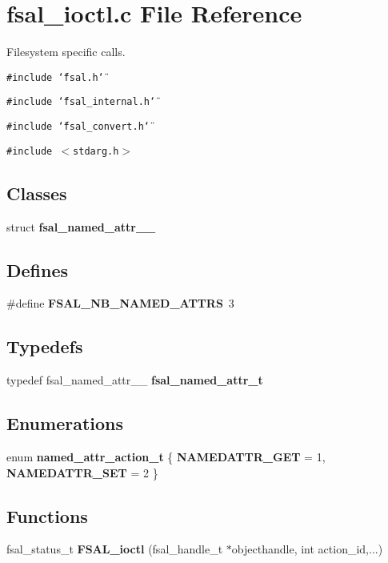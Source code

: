 \section{fsal\_\-ioctl.c File Reference}
\label{fsal__ioctl_8c}
Filesystem specific calls. 

{\tt \#include \char`\"{}fsal.h\char`\"{}}\par
{\tt \#include \char`\"{}fsal\_\-internal.h\char`\"{}}\par
{\tt \#include \char`\"{}fsal\_\-convert.h\char`\"{}}\par
{\tt \#include $<$stdarg.h$>$}\par
\subsection*{Classes}
\begin{CompactItemize}
\item 
struct {\bf fsal\_\-named\_\-attr\_\-\_\-}
\end{CompactItemize}
\subsection*{Defines}
\begin{CompactItemize}
\item 
\#define {\bf FSAL\_\-NB\_\-NAMED\_\-ATTRS}\ 3\label{fsal__ioctl_8c_a0}

\end{CompactItemize}
\subsection*{Typedefs}
\begin{CompactItemize}
\item 
typedef fsal\_\-named\_\-attr\_\-\_\- {\bf fsal\_\-named\_\-attr\_\-t}\label{fsal__ioctl_8c_a1}

\end{CompactItemize}
\subsection*{Enumerations}
\begin{CompactItemize}
\item 
enum {\bf named\_\-attr\_\-action\_\-t} \{ {\bf NAMEDATTR\_\-GET} =  1, 
{\bf NAMEDATTR\_\-SET} =  2
 \}
\end{CompactItemize}
\subsection*{Functions}
\begin{CompactItemize}
\item 
fsal\_\-status\_\-t {\bf FSAL\_\-ioctl} (fsal\_\-handle\_\-t $\ast$objecthandle, int action\_\-id,...)
\end{CompactItemize}


